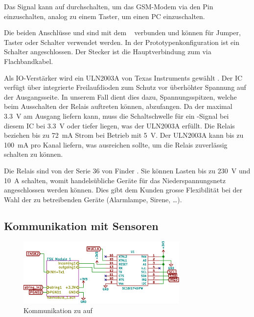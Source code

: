 Das Signal  kann auf  durchschalten, um das GSM-Modem
via den Pin   einzuschalten, analog zu einem  Taster, um einen
PC einzuschalten.

Die  beiden  Anschl\"usse    und   sind  mit  dem  \Raspi~
verbunden und k\"onnen f\"ur Jumper, Taster oder Schalter verwendet werden. In
der  Prototypenkonfiguration  ist   ein  Schalter  angeschlossen. Der  Stecker
 ist die Hauptverbindung zum \Raspi via Flachbandkabel.

Als  IO-Verst\"arker  wird  ein   ULN2003A  von  Texas  Instruments  gew\"ahlt
\cite{datasheet:darlingtonic}. Der    IC    verf\"ugt    \"uber    integrierte
Freilaufdioden   zum    Schutz   vor    \"uberh\"ohter   Spannung    auf   der
Ausgangsseite. In unserem Fall dient  dies dazu, Spannungsspitzen, welche beim
Ausschalten der Relais auftreten k\"onnen,  abzufangen.  Da der \Raspi maximal
\SI{3.3}{\volt} am  Ausgang liefern  kann, muss  die Schaltschwelle  f\"ur ein
-Signal bei diesem  IC bei \SI{3.3}{\volt} oder  tiefer liegen, was
der  ULN2003A erf\"ullt.   Die Relais  beziehen bis  zu \SI{72}{\milli\ampere}
\cite{datasheet:finder36relais}  Strom  bei   Betrieb  mit  \SI{5}{\volt}. Der
ULN2003A kann bis zu \SI{100}{\milli\ampere} pro Kanal liefern, was ausreichen
sollte, um die Relais zuverl\"assig schalten zu k\"onnen.

Die     Relais      sind     von      der     Serie     36      von     Finder
\cite{datasheet:finder36relais}. Sie  k\"onnen Lasten  bis zu  \SI{230}{\volt}
und  \SI{10}{\ampere}  schalten,  womit handels\"ubliche  Ger\"ate  f\"ur  das
Niederspannungsnetz angeschlossen werden k\"onnen. Dies gibt dem Kunden grosse
Flexibilit\"at bei der Wahl der  zu betreibenden Ger\"ate (Alarmlampe, Sirene,
\ldots).


\subsection{Kommunikation mit Sensoren}
\label{subsec:hw:master:sensorcomm}


\begin{figure}[h!t]
    \centering
    \includegraphics[width=0.75\textwidth]{images/superv-sch/supervisor--sch--comms.eps}
    \caption{Kommunikation zu \Sensor auf \Master}
    \label{fig:sch:master:comms}
\end{figure}

